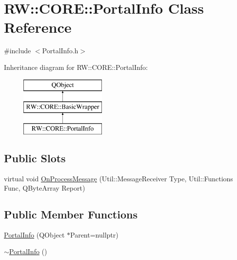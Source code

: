\hypertarget{class_r_w_1_1_c_o_r_e_1_1_portal_info}{}\section{RW\+:\+:C\+O\+RE\+:\+:Portal\+Info Class Reference}
\label{class_r_w_1_1_c_o_r_e_1_1_portal_info}


{\ttfamily \#include $<$Portal\+Info.\+h$>$}

Inheritance diagram for RW\+:\+:C\+O\+RE\+:\+:Portal\+Info\+:\begin{figure}[H]
\begin{center}
\leavevmode
\includegraphics[height=3.000000cm]{class_r_w_1_1_c_o_r_e_1_1_portal_info}
\end{center}
\end{figure}
\subsection*{Public Slots}
\begin{DoxyCompactItemize}
\item 
virtual void \hyperlink{class_r_w_1_1_c_o_r_e_1_1_portal_info_aa564efcfe704d21d9504e57ea76f59b9}{On\+Process\+Message} (Util\+::\+Message\+Receiver Type, Util\+::\+Functions Func, Q\+Byte\+Array Report)
\end{DoxyCompactItemize}
\subsection*{Public Member Functions}
\begin{DoxyCompactItemize}
\item 
\hyperlink{class_r_w_1_1_c_o_r_e_1_1_portal_info_a9f2c368244ee835c72aae72c40b4dc7f}{Portal\+Info} (Q\+Object $\ast$Parent=nullptr)
\item 
\hyperlink{class_r_w_1_1_c_o_r_e_1_1_portal_info_a9bc69018c7e68b82bf4406cd62310e5c}{$\sim$\+Portal\+Info} ()
\end{DoxyCompactItemize}
